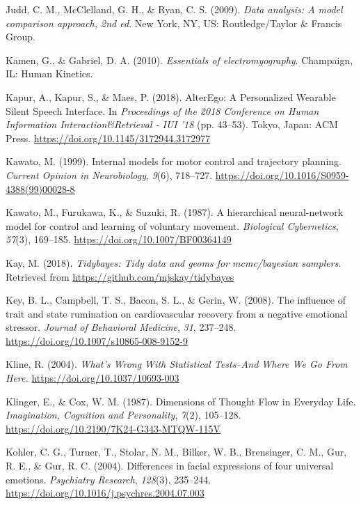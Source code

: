 \documentclass[a4paper,12pt,twoside,openright,oldfontcommands]{memoir}
\begin{document}
\leavevmode\hypertarget{ref-judd_data_2009}{}%
Judd, C. M., McClelland, G. H., \& Ryan, C. S. (2009). \emph{Data analysis: A model comparison approach, 2nd ed}. New York, NY, US: Routledge/Taylor \& Francis Group.

\leavevmode\hypertarget{ref-kamen_essentials_2010}{}%
Kamen, G., \& Gabriel, D. A. (2010). \emph{Essentials of electromyography}. Champaign, IL: Human Kinetics.

\leavevmode\hypertarget{ref-kapur_alterego:_2018}{}%
Kapur, A., Kapur, S., \& Maes, P. (2018). AlterEgo: A Personalized Wearable Silent Speech Interface. In \emph{Proceedings of the 2018 Conference on Human Information Interaction\&Retrieval - IUI '18} (pp. 43--53). Tokyo, Japan: ACM Press. \url{https://doi.org/10.1145/3172944.3172977}

\leavevmode\hypertarget{ref-kawato_internal_1999}{}%
Kawato, M. (1999). Internal models for motor control and trajectory planning. \emph{Current Opinion in Neurobiology}, \emph{9}(6), 718--727. \url{https://doi.org/10.1016/S0959-4388(99)00028-8}

\leavevmode\hypertarget{ref-kawato_hierarchical_1987}{}%
Kawato, M., Furukawa, K., \& Suzuki, R. (1987). A hierarchical neural-network model for control and learning of voluntary movement. \emph{Biological Cybernetics}, \emph{57}(3), 169--185. \url{https://doi.org/10.1007/BF00364149}

\leavevmode\hypertarget{ref-R-tidybayes}{}%
Kay, M. (2018). \emph{Tidybayes: Tidy data and geoms for mcmc/bayesian samplers}. Retrieved from \url{https://github.com/mjskay/tidybayes}

\leavevmode\hypertarget{ref-Key2008}{}%
Key, B. L., Campbell, T. S., Bacon, S. L., \& Gerin, W. (2008). The influence of trait and state rumination on cardiovascular recovery from a negative emotional stressor. \emph{Journal of Behavioral Medicine}, \emph{31}, 237--248. \url{https://doi.org/10.1007/s10865-008-9152-9}

\leavevmode\hypertarget{ref-Kline2004}{}%
Kline, R. (2004). \emph{What's Wrong With Statistical Tests--And Where We Go From Here.} \url{https://doi.org/10.1037/10693-003}

\leavevmode\hypertarget{ref-klinger_dimensions_1987}{}%
Klinger, E., \& Cox, W. M. (1987). Dimensions of Thought Flow in Everyday Life. \emph{Imagination, Cognition and Personality}, \emph{7}(2), 105--128. \url{https://doi.org/10.2190/7K24-G343-MTQW-115V}

\leavevmode\hypertarget{ref-kohler_differences_2004}{}%
Kohler, C. G., Turner, T., Stolar, N. M., Bilker, W. B., Brensinger, C. M., Gur, R. E., \& Gur, R. C. (2004). Differences in facial expressions of four universal emotions. \emph{Psychiatry Research}, \emph{128}(3), 235--244. \url{https://doi.org/10.1016/j.psychres.2004.07.003}
\end{document}
